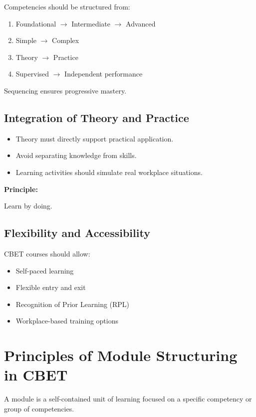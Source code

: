 \documentclass[12pt]{article}
\begin{document}
Competencies should be structured from:

\begin{enumerate}
    \item Foundational $\rightarrow$ Intermediate $\rightarrow$ Advanced
    \item Simple $\rightarrow$ Complex
    \item Theory $\rightarrow$ Practice
    \item Supervised $\rightarrow$ Independent performance
\end{enumerate}

Sequencing ensures progressive mastery.

\subsection{Integration of Theory and Practice}

\begin{itemize}
    \item Theory must directly support practical application.
    \item Avoid separating knowledge from skills.
    \item Learning activities should simulate real workplace situations.
\end{itemize}

\textbf{Principle:}

Learn by doing.

\subsection{Flexibility and Accessibility}

CBET courses should allow:

\begin{itemize}
    \item Self-paced learning
    \item Flexible entry and exit
    \item Recognition of Prior Learning (RPL)
    \item Workplace-based training options
\end{itemize}

\section{Principles of Module Structuring in CBET}

A module is a self-contained unit of learning focused on a specific competency or group of competencies.
\end{document}
